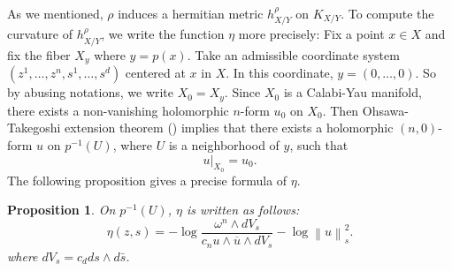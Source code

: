 \documentclass{amsart}
\newtheorem{proposition}[theorem]{Proposition}
\theoremstyle{definition}
\numberwithin{equation}{section}
\begin{document}
As we mentioned, $\rho$ induces a hermitian metric $h^\rho_{X/Y}$ on $K_{X/Y}$. To compute the curvature of $h^\rho_{X/Y}$, we write the function $\eta$ more precisely:
Fix a point $x\in X$ and fix the fiber $X_y$ where $y=p(x)$. Take an admissible coordinate system $(z^1,\dots,z^n,s^1,\dots,s^d)$ centered at $x$ in $X$. In this coordinate, $y=(0,\dots,0)$. So by abusing notations, we write $X_0=X_y$.
Since $X_0$ is a Calabi-Yau manifold, there exists a non-vanishing holomorphic $n$-form $u_0$ on $X_0$. Then Ohsawa-Takegoshi extension theorem (\cite{Berndtsson2}) implies that there exists a holomorphic $(n,0)$-form $u$ on $p^{-1}(U)$, where $U$ is a neighborhood of $y$, such that
\begin{equation*}
u\vert_{X_0}=u_0.
\end{equation*}
The following proposition gives a precise formula of $\eta$.

\begin{proposition} \label{P:key_p}
On $p^{-1}(U)$, $\eta$ is written as follows:
\begin{equation}\label{E:eta}
\eta(z,s)
=
-\log\frac{\omega^n\wedge dV_s}
	{c_n u\wedge \overline{u}\wedge dV_s}
-\log{\left\|{u}\right\|}^2_s.
\end{equation}
where $dV_s=c_d ds\wedge d\bar s$.
\end{proposition}
\end{document}
